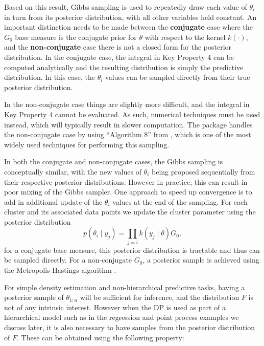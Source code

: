 \documentclass[nojss]{jss}
\begin{document}
Based on this result, Gibbs sampling is used to repeatedly draw each value of $\theta_i$ in turn from its posterior distribution, with all other variables held constant. An important distinction needs to be made between the \textbf{conjugate} case where the $G_0$ base measure is the conjugate prior for $\theta$ with respect to the kernel $k(\cdot)$, and the \textbf{non-conjugate} case there is not a closed form for the posterior distribution. In the conjugate case, the integral in Key Property 4 can be computed analytically and the resulting distribution is simply the predictive distribution. In this case, the $\theta_i$ values can be sampled directly from their true posterior distribution.

In the non-conjugate case things are slightly more difficult, and the integral in Key Property 4 cannot be evaluated. As such, numerical techniques must be used instead, which will typically result in slower computation. The  package handles the non-conjugate case by using ``Algorithm 8'' from \citep{neal_markov_2000}, which is one of the most widely used techniques for performing this sampling.

In both the conjugate and non-conjugate cases, the Gibbs sampling is conceptually similar, with the new values of $\theta_i$ being proposed sequentially from their respective posterior distributions. However in practice, this can result in poor mixing of the Gibbs sampler. One approach to speed up convergence is to add in additional update of the $\theta_i$ values at the end of the sampling. For each cluster and its associated data points we update the cluster parameter using the posterior distribution
\begin{equation}
p (\theta _i \mid y_{j}) = \prod _{j=i} k(y_j \mid \theta) G_0,
\label{eq:clusterpost}
\end{equation}
for a conjugate base measure, this posterior distribution is tractable and thus can be sampled directly. For a non-conjugate $G_0$, a posterior sample is achieved using the Metropolis-Hastings algorithm \citep{hastings_monte_1970}.

For simple density estimation and non-hierarchical predictive tasks, having a posterior sample of $\theta_{1:n}$ will be sufficient for inference, and the distribution $F$ is not of any intrinsic interest. However when the DP is used as part of a hierarchical model such as in the regression and point process examples we discuss later, it is also necessary to have samples from the posterior distribution of $F$. These can be obtained using the following property:
\end{document}
